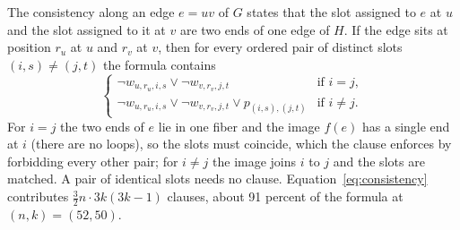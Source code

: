 \documentclass[11pt]{article}
\theoremstyle{definition}
\theoremstyle{remark}
\begin{document}
The consistency along an edge $e = uv$ of $G$ states that the slot assigned to $e$ at $u$ and the slot assigned to it at $v$ are two ends of one edge of $H$. If the
edge sits at position $r_u$ at $u$ and $r_v$ at $v$, then for every ordered pair of distinct slots $(i,s) \ne (j,t)$ the formula contains
\begin{equation}\label{eq:consistency}
\begin{cases}
\neg w_{u,r_u,i,s} \vee \neg w_{v,r_v,j,t} & \text{if } i = j,\\
\neg w_{u,r_u,i,s} \vee \neg w_{v,r_v,j,t} \vee p_{(i,s),(j,t)} & \text{if } i \ne j.
\end{cases}
\end{equation}
For $i = j$ the two ends of $e$ lie in one fiber and the image $f(e)$ has a single end at $i$ (there are no loops), so the slots must coincide, which the clause
enforces by forbidding every other pair; for $i \ne j$ the image joins $i$ to $j$ and the slots are matched. A pair of identical slots needs no clause.
Equation~\eqref{eq:consistency} contributes $\tfrac32 n \cdot 3k(3k-1)$ clauses, about 91 percent of the formula at $(n,k) = (52,50)$.
\end{document}
